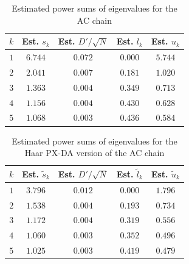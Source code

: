 \documentclass[11pt]{article}
\begin{document}
	\begin{table}[!h]
		\begin{center} \caption{Estimated power sums of eigenvalues for the AC chain} \label{probit}
             \medskip
			\begin{tabular}{ccccc} 
				$k$ & Est. $s_k$ & Est. $D'/\sqrt{N}$ & Est. $l_k$ & Est. $u_k$ \\ \hline
				$1$ & $6.744$ & $0.072$ & $0.000$ & $5.744$ \\
				$2$ & $2.041$ & $0.007$ & $0.181$ & $1.020$ \\
				$3$ & $1.363$ & $0.004$ & $0.349$ & $0.713$ \\
				$4$ & $1.156$ & $0.004$ & $0.430$ & $0.628$ \\
				$5$ & $1.068$ & $0.003$ & $0.436$ & $0.584$ \\
			\end{tabular}
		\end{center}
	\end{table}
	
	
	\begin{table}[!h]
		\begin{center} \caption{Estimated power sums of eigenvalues for the Haar PX-DA version of the AC chain} \label{probit2}
			\medskip
			\begin{tabular}{ccccc} 
				$k$ & Est. $\tilde{s}_k$ & Est. $D'/\sqrt{N}$ & Est. $\tilde{l}_k$ & Est. $\tilde{u}_k$ \\ \hline
				$1$ & $3.796$ & $0.012$ & $0.000$ & $1.796$ \\
				$2$ & $1.538$ & $0.004$ & $0.193$ & $0.734$ \\
				$3$ & $1.172$ & $0.004$ & $0.319$ & $0.556$ \\
				$4$ & $1.060$ & $0.003$ & $0.352$ & $0.496$ \\
				$5$ & $1.025$ & $0.003$ & $0.419$ & $0.479$ \\
			\end{tabular}
		\end{center}
	\end{table}
	
\end{document}
